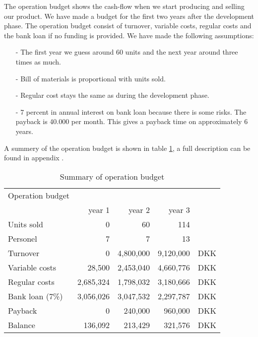 The operation budget shows the cash-flow when we start producing and selling our product. We have made a budget for the first two years after the development phase. The operation budget consist of turnover, variable costs, regular costs and the bank loan if no funding is provided. We have made the following assumptions:
\begin{itemize}
\item[-] The first year we guess around 60 units and the next year around three times as much.
\item[-] Bill of materials is proportional with units sold.
\item[-] Regular cost stays the same as during the development phase.
\item[-] 7 percent in annual interest on bank loan because there is some risks. The payback is 40.000 per month. This gives a payback time on approximately 6 years.
\end{itemize}
A summery of the operation budget is shown in table \ref{opebud}, a full description can be found in appendix .
\begin{table}[h!]
\centering
\begin{tabular}{l r r r r}
Operation budget      &            &              &             &    \\
                      & year 1     & year 2       & year 3      &    \\
\hline                                                               
Units sold            &          0 &        60   &         114  &    \\
Personel              &          7 &         7   &          13  &    \\ 
\hline                                              
Turnover              &          0 & 4,800,000   &   9,120,000  & DKK\\
Variable costs        &     28,500 & 2,453,040   &   4,660,776  & DKK\\
Regular costs         &  2,685,324 & 1,798,032   &   3,180,666  & DKK\\
Bank loan (7\%)       &  3,056,026 & 3,047,532   &   2,297,787  & DKK\\
Payback               &          0 &   240,000   &     960,000  & DKK\\
Balance               &    136,092 &   213,429   &     321,576  & DKK\\  
\end{tabular}
\caption{Summary of operation budget}
\label{opebud}
\end{table}
